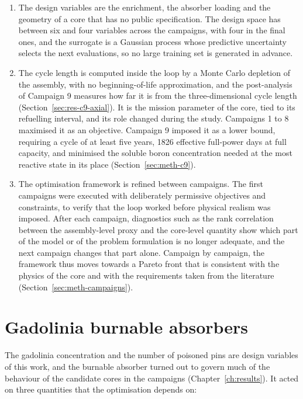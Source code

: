 \begin{enumerate}
  \item The design variables are the enrichment, the absorber loading
        and the geometry of a core that has no public specification. The
        design space has between six and four variables across the
        campaigns, with four in the final ones, and the surrogate is a
        Gaussian process whose predictive uncertainty selects the next
        evaluations, so no large training set is generated in advance.

  \item The cycle length is computed inside the loop by a Monte Carlo
        depletion of the assembly, with no beginning-of-life
        approximation, and the post-analysis of Campaign 9 measures how
        far it is from the three-dimensional cycle length
        (Section~\ref{sec:res-c9-axial}). It is
        the mission parameter of the core, tied to its refuelling
        interval, and its role changed during the study. Campaigns 1 to 8
        maximised it as an objective. Campaign 9 imposed it as a lower
        bound, requiring a cycle of at least five years, 1826 effective
        full-power days at full capacity, and minimised the soluble
        boron concentration needed at the most reactive state in its
        place (Section~\ref{sec:meth-c9}).

  \item The optimisation framework is refined between campaigns. The
        first campaigns were executed with deliberately permissive objectives
        and constraints, to verify that the loop worked before physical
        realism was imposed. After each campaign, diagnostics such as the
        rank correlation between the assembly-level proxy and the
        core-level quantity show which part of the model or of the
        problem formulation is no longer adequate, and the next campaign
        changes that part alone. Campaign by campaign, the framework thus
        moves towards a Pareto front that is consistent with the physics
        of the core and with the requirements taken from the literature
        (Section~\ref{sec:meth-campaigns}).
\end{enumerate}

\section{Gadolinia burnable absorbers}
\label{sec:lit-gd}

The gadolinia concentration and the number of poisoned pins are design
variables of this work, and the burnable absorber turned out to govern
much of the behaviour of the candidate cores in the campaigns
(Chapter~\ref{ch:results}). It acted on three quantities that the
optimisation depends on:

